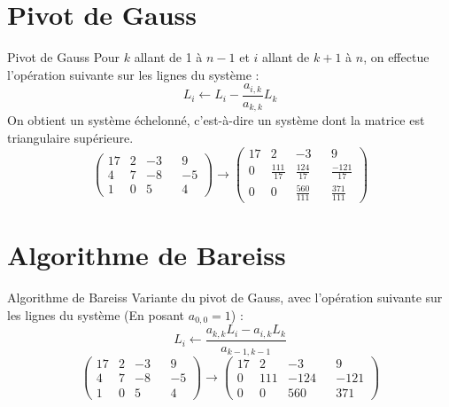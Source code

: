 \documentclass[11pt]{beamer}
\begin{document}
	\section{Pivot de Gauss}
	\begin{frame}{Pivot de Gauss}
		Pour $k$ allant de 1 à $n-1$ et $i$ allant de $k+1$ à $n$, on effectue l'opération suivante sur les lignes du système :
		\newline
		$$L_i \gets L_i - \frac{a_{i,k}}{a_{k,k}} L_k$$
		\newline
		On obtient un système échelonné, c'est-à-dire un système dont la matrice est triangulaire supérieure.
		\vspace{0.5cm}
		\begin{equation*}
			\begin{pmatrix}
				17 & 2 & -3 & & 9\\
				4 & 7 & -8 & & -5\\
				1 & 0 & 5 & & 4
			\end{pmatrix}
			\longrightarrow
			\begin{pmatrix}
				17 & 2 & -3 & & 9\\
				0 & \frac{111}{17} & \frac{124}{17} & & \frac{-121}{17}\\
				0 & 0 & \frac{560}{111} & & \frac{371}{111}
			\end{pmatrix}
		\end{equation*}
	\end{frame}
	
	\section{Algorithme de Bareiss}
	\begin{frame}{Algorithme de Bareiss}
		Variante du pivot de Gauss, avec l'opération suivante sur les lignes du système (En posant $a_{0,0} = 1$) :
		$$L_i \gets \frac{a_{k,k} L_i - a_{i,k} L_k}{a_{k-1,k-1}}$$
		\vspace{0.8cm}
		\begin{equation*}
			\begin{pmatrix}
				17 & 2 & -3 & & 9\\
				4 & 7 & -8 & & -5\\
				1 & 0 & 5 & & 4
			\end{pmatrix}
			\longrightarrow
			\begin{pmatrix}
				17 & 2 & -3 & & 9\\
				0 & 111 & -124 & & -121\\
				0 & 0 & 560 & & 371
			\end{pmatrix}
		\end{equation*}
	\end{frame}
	
\end{document}
